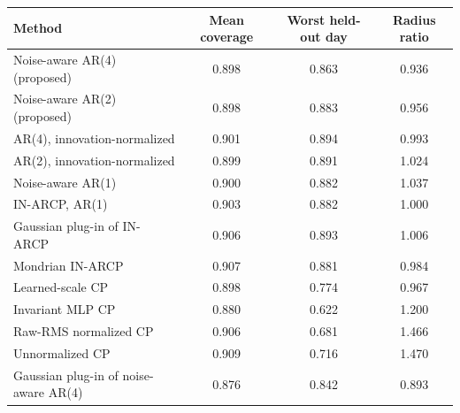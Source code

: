 \begin{tabular}{lccc}
\toprule
Method & Mean coverage & Worst held-out day & Radius ratio\\
\midrule
Noise-aware AR(4) (proposed) & 0.898 & 0.863 & 0.936\\
Noise-aware AR(2) (proposed) & 0.898 & 0.883 & 0.956\\
AR(4), innovation-normalized & 0.901 & 0.894 & 0.993\\
AR(2), innovation-normalized & 0.899 & 0.891 & 1.024\\
Noise-aware AR(1) & 0.900 & 0.882 & 1.037\\
IN-ARCP, AR(1) & 0.903 & 0.882 & 1.000\\
Gaussian plug-in of IN-ARCP & 0.906 & 0.893 & 1.006\\
Mondrian IN-ARCP & 0.907 & 0.881 & 0.984\\
Learned-scale CP & 0.898 & 0.774 & 0.967\\
Invariant MLP CP & 0.880 & 0.622 & 1.200\\
Raw-RMS normalized CP & 0.906 & 0.681 & 1.466\\
Unnormalized CP & 0.909 & 0.716 & 1.470\\
Gaussian plug-in of noise-aware AR(4) & 0.876 & 0.842 & 0.893\\
\bottomrule
\end{tabular}
